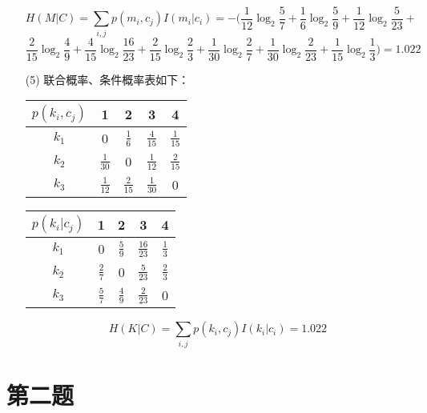 \documentclass{article}
\begin{document}
\begin{itemize}
\[ H(M|C) = \sum_{i,j} p(m_i,c_j)I(m_i|c_i)=-(\frac{1}{12}\log_2\frac{5}{7}+\frac{1}{6}\log_2\frac{5}{9}+\frac{1}{12}\log_2\frac{5}{23}+\]
\[\frac{2}{15}\log_2\frac{4}{9}+\frac{4}{15}\log_2\frac{16}{23}+\frac{2}{15}\log_2\frac{2}{3}+\frac{1}{30}\log_2\frac{2}{7}+\frac{1}{30}\log_2\frac{2}{23}+\frac{1}{15}\log_2\frac{1}{3})=1.022\]

\item [(5)]
联合概率、条件概率表如下：

\begin{tabular}{ccccc}
\hline
$p(k_i,c_j)$ & 1 & 2 & 3 & 4 \\
\hline
$k_1$ & 0 & $\frac{1}{6}$ & $\frac{4}{15}$ & $\frac{1}{15}$ \\
$k_2$ & $\frac{1}{30}$ & 0 & $\frac{1}{12}$ & $\frac{2}{15}$ \\
$k_3$ & $\frac{1}{12}$ & $\frac{2}{15}$ & $\frac{1}{30}$ & 0 \\
\hline
\end{tabular}
\begin{tabular}{ccccc}
\hline
$p(k_i|c_j)$&1&2&3&4\\
\hline
$k_1$ & 0 & $\frac{5}{9}$ & $\frac{16}{23}$ & $\frac{1}{3}$ \\
$k_2$ & $\frac{2}{7}$ & 0 & $\frac{5}{23}$ & $\frac{2}{3}$ \\
$k_3$ & $\frac{5}{7}$ & $\frac{4}{9}$ & $\frac{2}{23}$ & 0 \\
\hline
\end{tabular}

\[ H(K|C) = \sum_{i,j} p(k_i,c_j)I(k_i|c_i)=1.022\]
\end{itemize}


\section*{第二题}
\end{document}
